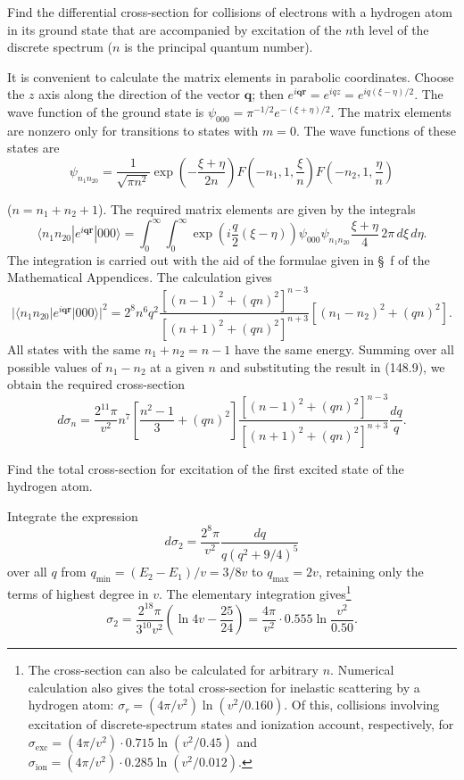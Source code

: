  Find the differential cross-section for collisions of
electrons with a hydrogen atom in its ground state that are accompanied by
excitation of the $n$th level of the discrete spectrum ($n$ is the principal
quantum number).

\SolutionHeading It is convenient to calculate the matrix elements in
parabolic coordinates. Choose the $z$ axis along the direction of the vector
$\mathbf q$; then
$e^{i\mathbf q\mathbf r}=e^{iqz}=e^{iq(\xi-\eta)/2}$. The wave function of the
ground state is $\psi_{000}=\pi^{-1/2}e^{-(\xi+\eta)/2}$. The matrix elements
are nonzero only for transitions to states with $m=0$. The wave functions of
these states are
\[
 \psi_{n_1n_20}=\frac1{\sqrt{\pi n^2}}\exp\!\left(-\frac{\xi+\eta}{2n}\right)
 F\!\left(-n_1,1,\frac\xi n\right)F\!\left(-n_2,1,\frac\eta n\right)
\]

($n=n_1+n_2+1$). The required matrix elements are given by the integrals
\[
 \langle n_1n_20|e^{i\mathbf q\mathbf r}|000\rangle=
 \int_0^\infty\!\!\int_0^\infty
 \exp\!\left(i\frac q2(\xi-\eta)\right)\psi_{000}\psi_{n_1n_20}
 \frac{\xi+\eta}{4}\,2\pi\,d\xi\,d\eta.
\]
The integration is carried out with the aid of the formulae given in \S~f of
the Mathematical Appendices. The calculation gives
\[
 |\langle n_1n_20|e^{i\mathbf q\mathbf r}|000\rangle|^2
 =2^8n^6q^2\frac{[(n-1)^2+(qn)^2]^{n-3}}{[(n+1)^2+(qn)^2]^{n+3}}
 [(n_1-n_2)^2+(qn)^2].
\]
All states with the same $n_1+n_2=n-1$ have the same energy. Summing over all
possible values of $n_1-n_2$ at a given $n$ and substituting the result in
(148.9), we obtain the required cross-section
\[
 d\sigma_n=\frac{2^{11}\pi}{v^2}n^7\left[\frac{n^2-1}{3}+(qn)^2\right]
 \frac{[(n-1)^2+(qn)^2]^{n-3}}{[(n+1)^2+(qn)^2]^{n+3}}\frac{dq}{q}.
\]

 Find the total cross-section for excitation of the first
excited state of the hydrogen atom.

\SolutionHeading Integrate the expression
\[
 d\sigma_2=\frac{2^8\pi}{v^2}\frac{dq}{q(q^2+9/4)^5}
\]
over all $q$ from $q_{\min}=(E_2-E_1)/v=3/8v$ to $q_{\max}=2v$, retaining only
the terms of highest degree in $v$. The elementary integration gives\footnote{The
cross-section can also be calculated for arbitrary $n$. Numerical calculation
also gives the total cross-section for inelastic scattering by a hydrogen
atom: $\sigma_r=(4\pi/v^2)\ln(v^2/0.160)$. Of this, collisions involving
excitation of discrete-spectrum states and ionization account, respectively,
for $\sigma_{\mathrm{exc}}=(4\pi/v^2)\cdot0.715\ln(v^2/0.45)$ and
$\sigma_{\mathrm{ion}}=(4\pi/v^2)\cdot0.285\ln(v^2/0.012)$.}
\[
 \sigma_2=\frac{2^{18}\pi}{3^{10}v^2}\left(\ln4v-\frac{25}{24}\right)
 =\frac{4\pi}{v^2}\cdot0.555\ln\frac{v^2}{0.50}.
\]

